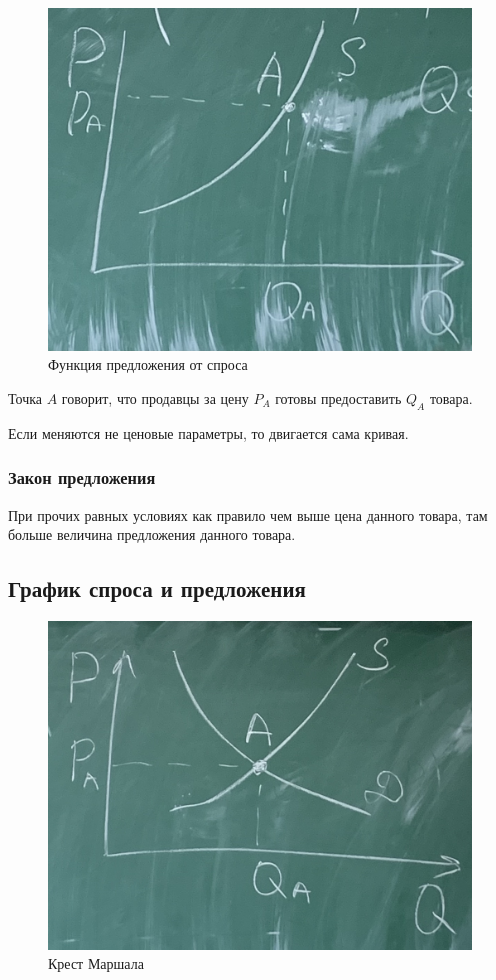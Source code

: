 \begin{figure}[H]
    \centering
    \includegraphics[scale=0.1]{img/predloj.JPG}
    \caption{Функция предложения от спроса}
\end{figure}

Точка $A$ говорит, что продавцы за цену $P_A$ готовы предоставить $Q_A$ товара.

Если меняются не ценовые параметры, то двигается сама кривая.

\subsubsection{Закон предложения}

При прочих равных условиях как правило чем выше цена данного товара, там больше величина предложения данного товара.

\subsection{График спроса и предложения}

\begin{figure}[H]
    \centering
    \includegraphics[scale=0.1]{img/krest.JPG}
    \caption{Крест Маршала}
\end{figure}

